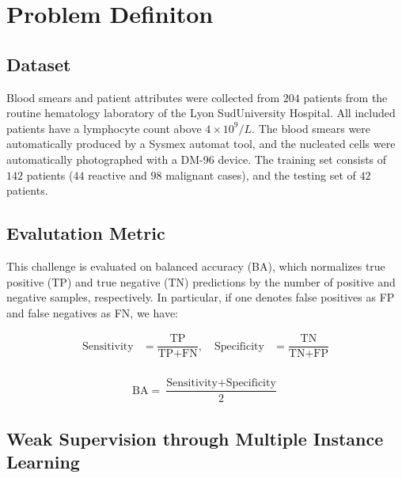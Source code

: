\documentclass[final]{cvpr}
\begin{document}
	\section{Problem Definiton}
	
	\subsection{Dataset}
	
	Blood smears and patient attributes were collected from $204$ patients from the routine hematology laboratory of the Lyon SudUniversity Hospital. All included patients have a lymphocyte count above $4\times10^9/L$. The blood smears were automatically produced by a Sysmex automat tool, and the nucleated cells were automatically photographed with a DM-96 device. The training set consists of $142$ patients ($44$ reactive and $98$ malignant cases), and the testing set of $42$ patients.
	
	\subsection{Evalutation Metric} 
	
	This challenge is evaluated on balanced accuracy (BA), which normalizes true positive (TP) and true negative (TN) predictions by the number of positive and negative samples, respectively. In particular, if one denotes false positives as FP and false negatives as FN, we have:
	
	\vspace{-2mm}
	
	\begin{equation*}
		\begin{aligned}
			\text{Sensitivity} & = \dfrac{\text{TP}}{\text{TP}+\text{FN}} ,\quad 
			\text{Specificity} & = \dfrac{\text{TN}}{\text{TN}+\text{FP}}\\
		\end{aligned}
	\end{equation*}

	\begin{equation*}
		\begin{aligned}
			\text{BA} = \dfrac{\text{Sensitivity}+\text{Specificity}}{2}
		\end{aligned}
	\end{equation*}
		
	\vspace{2mm}
	
	\subsection{Weak Supervision through Multiple Instance Learning} 
	
\end{document}
